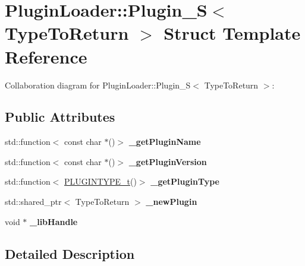 \hypertarget{structPluginLoader_1_1Plugin__S}{}\section{Plugin\+Loader\+::Plugin\+\_\+S$<$ Type\+To\+Return $>$ Struct Template Reference}
\label{structPluginLoader_1_1Plugin__S}


Collaboration diagram for Plugin\+Loader\+::Plugin\+\_\+S$<$ Type\+To\+Return $>$\+:
\subsection*{Public Attributes}
\begin{DoxyCompactItemize}
\item 
\mbox{\label{structPluginLoader_1_1Plugin__S_acc22d037a0de2457234d967f1082a69d}} 
std\+::function$<$ const char $\ast$()$>$ {\bfseries \+\_\+get\+Plugin\+Name}
\item 
\mbox{\label{structPluginLoader_1_1Plugin__S_ac62c9d3efa2dfbbe58ef8976c57ff2d4}} 
std\+::function$<$ const char $\ast$()$>$ {\bfseries \+\_\+get\+Plugin\+Version}
\item 
\mbox{\label{structPluginLoader_1_1Plugin__S_a2b301265f75c44e9d54ebf68082d14bb}} 
std\+::function$<$ \mbox{\hyperlink{namespacePluginLoader_a7b1358e9577b47b5d4b16231a5a81699}{P\+L\+U\+G\+I\+N\+T\+Y\+P\+E\+\_\+t}}()$>$ {\bfseries \+\_\+get\+Plugin\+Type}
\item 
\mbox{\label{structPluginLoader_1_1Plugin__S_abcbce0a2d97df9380151f41f1ade88e1}} 
std\+::shared\+\_\+ptr$<$ Type\+To\+Return $>$ {\bfseries \+\_\+new\+Plugin}
\item 
\mbox{\label{structPluginLoader_1_1Plugin__S_a9894b72dfc570b10a05c9b10d83fc33f}} 
void $\ast$ {\bfseries \+\_\+lib\+Handle}
\end{DoxyCompactItemize}


\subsection{Detailed Description}
